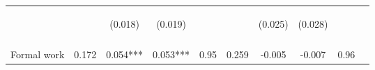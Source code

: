 \begin{table}[h!]
{\begin{tabular}{lccccccccc}
 & \begin{footnotesize}\end{footnotesize} & \begin{footnotesize}(0.018)\end{footnotesize} & \begin{footnotesize}(0.019)\end{footnotesize} & \begin{footnotesize}\end{footnotesize} & \begin{footnotesize}\end{footnotesize} & \begin{footnotesize}(0.025)\end{footnotesize} & \begin{footnotesize}(0.028)\end{footnotesize} & \begin{footnotesize}\end{footnotesize} & \begin{footnotesize}\end{footnotesize}\\
 & \begin{footnotesize}\end{footnotesize} & \begin{footnotesize}[0.215]\end{footnotesize} & \begin{footnotesize}[0.004]\end{footnotesize} & \begin{footnotesize}\end{footnotesize} & \begin{footnotesize}\end{footnotesize} & \begin{footnotesize}[0.411]\end{footnotesize} & \begin{footnotesize}[1.000]\end{footnotesize} & \begin{footnotesize}\end{footnotesize} & \begin{footnotesize}\end{footnotesize}\\
\noalign{\smallskip}Formal work & 0.172 & 0.054*** & 0.053*** & 0.95 & 0.259 & -0.005 & -0.007 & 0.96 & \\

\end{tabular}}
\end{table}
